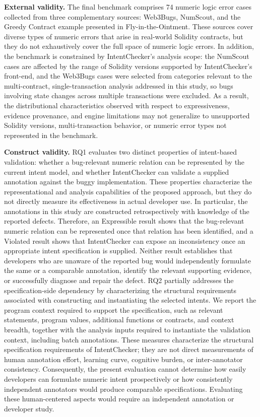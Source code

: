\documentclass[pdflatex,sn-basic]{sn-jnl}%
\theoremstyle{thmstyleone}%
\theoremstyle{thmstyletwo}%
\theoremstyle{thmstylethree}%
\begin{document}
\smallskip
\noindent\textbf{External validity.}
The final benchmark comprises 74 numeric logic error cases collected from three complementary sources: Web3Bugs, NumScout, and the Greedy Contract example presented in Fly-in-the-Ointment. These sources cover diverse types of numeric errors that arise in real-world Solidity contracts, but they do not exhaustively cover the full space of numeric logic errors. In addition, the benchmark is constrained by IntentChecker's analysis scope: the NumScout cases are affected by the range of Solidity versions supported by IntentChecker's front-end, and the Web3Bugs cases were selected from categories relevant to the multi-contract, single-transaction analysis addressed in this study, so bugs involving state changes across multiple transactions were excluded. As a result, the distributional characteristics observed with respect to expressiveness, evidence provenance, and engine limitations may not generalize to unsupported Solidity versions, multi-transaction behavior, or numeric error types not represented in the benchmark.

\smallskip
\noindent\textbf{Construct validity.}
RQ1 evaluates two distinct properties of intent-based validation: whether a bug-relevant numeric relation can be represented by the current intent model, and whether IntentChecker can validate a supplied annotation against the buggy implementation. These properties characterize the representational and analysis capabilities of the proposed approach, but they do not directly measure its effectiveness in actual developer use. In particular, the annotations in this study are constructed retrospectively with knowledge of the reported defects. Therefore, an Expressible result shows that the bug-relevant numeric relation can be represented once that relation has been identified, and a Violated result shows that IntentChecker can expose an inconsistency once an appropriate intent specification is supplied. Neither result establishes that developers who are unaware of the reported bug would independently formulate the same or a comparable annotation, identify the relevant supporting evidence, or successfully diagnose and repair the defect. RQ2 partially addresses the specification-side dependency by characterizing the structural requirements associated with constructing and instantiating the selected intents. We report the program context required to support the specification, such as relevant statements, program values, additional functions or contracts, and context breadth, together with the analysis inputs required to instantiate the validation context, including batch annotations. These measures characterize the structural specification requirements of IntentChecker; they are not direct measurements of human annotation effort, learning curve, cognitive burden, or inter-annotator consistency. Consequently, the present evaluation cannot determine how easily developers can formulate numeric intent prospectively or how consistently independent annotators would produce comparable specifications. Evaluating these human-centered aspects would require an independent annotation or developer study.
\end{document}
